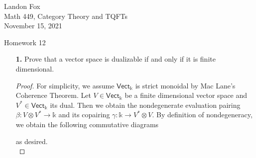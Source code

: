 \documentclass[ 12pt ]{article}
\begin{document}
\noindent Landon Fox \\
\noindent Math 449, Category Theory and TQFTs \\
\noindent November 15, 2021

\begin{center}
\Large Homework 12
\end{center}

\begin{enumerate}

	\item[\textbf{1.}] Prove that a vector space is dualizable if and only if it is finite dimensional.

		\begin{proof}
			For simplicity, we assume $\mathsf{Vect}_\mathbb{k}$ is strict monoidal by Mac Lane's Coherence Theorem. Let $V \in \mathsf{Vect}_\mathbb{k}$ be a finite dimensional vector space and $V^\ast \in \mathsf{Vect}_\mathbb{k}$ its dual. Then we obtain the nondegenerate evaluation pairing $\beta : V \otimes V^\ast \to \mathbb{k}$ and its copairing $\gamma : \mathbb{k} \to V^\ast \otimes V$. By definition of nondegeneracy, we obtain the following commutative diagrams
			\begin{center}
			\end{center}
			as desired. \\


\end{proof}
\end{enumerate}
\end{document}
